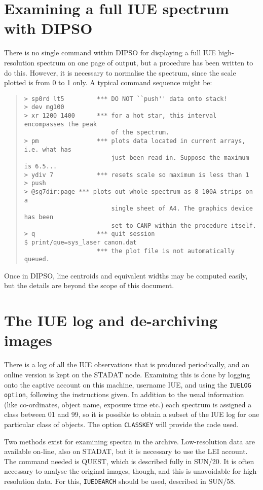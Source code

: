 \section{Examining a full IUE spectrum with DIPSO}

There is no single command within DIPSO for displaying a full IUE 
high-resolution spectrum on one page of output, but a procedure has been 
written to do this. However, it is necessary to normalise the spectrum, 
since the scale plotted is from 0 to 1 only. A typical command sequence 
might be:
\begin{quote}
\begin{verbatim}
> sp0rd lt5         *** DO NOT ``push'' data onto stack!
> dev mg100         
> xr 1200 1400      *** for a hot star, this interval encompasses the peak 
                        of the spectrum. 
> pm                *** plots data located in current arrays, i.e. what has
                        just been read in. Suppose the maximum is 6.5...
> ydiv 7            *** resets scale so maximum is less than 1
> push 
> @sg7dir:page *** plots out whole spectrum as 8 100A strips on a
                        single sheet of A4. The graphics device has been
                        set to CANP within the procedure itself. 
> q                 *** quit session
$ print/que=sys_laser canon.dat
                    *** the plot file is not automatically queued. 
\end{verbatim}
\end{quote}
Once in DIPSO, line centroids and equivalent widths may be computed 
easily, but the details are beyond the scope of this document. 

\section{The IUE log and de-archiving images}

There is a log of all the IUE observations that is produced periodically, and 
an online version is kept on the STADAT node. Examining this is done by 
logging onto the captive account on this machine, username IUE, and using the 
{\tt IUELOG option}, following the instructions given. In addition to
the usual information (like co-ordinates, object name, exposure time etc.)
each spectrum is assigned a class between 01 and 99, so it is possible to 
obtain a subset of the IUE log for one particular class of objects. The 
option {\tt CLASSKEY} will provide the code used. 

Two methods exist for examining spectra in the archive. Low-resolution data 
are available on-line, also on STADAT, but it is necessary to use the LEI 
account. The command needed is QUEST, which is described fully in 
SUN/20. It is often necessary to analyse the original images, though, 
and this is unavoidable for high-resolution data. For this, {\tt IUEDEARCH}
should be used, described in SUN/58. 

